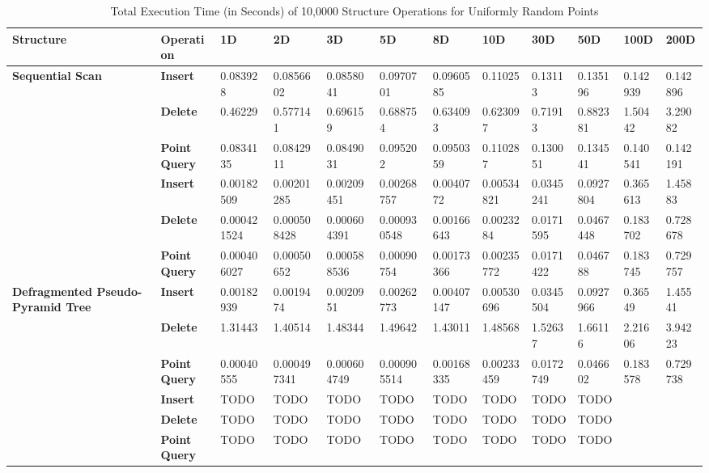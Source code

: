 \begin{landscape}

	\begin{table}
		\centering
		\begin{tabular}{|p{2cm}|l|l|l|l|l|l|l|l|l|l|l|}
			\hline
			\textbf{Structure} & \textbf{Operation} & \textbf{1D} & \textbf{2D} & \textbf{3D} & \textbf{5D} & \textbf{8D} & \textbf{10D} & \textbf{30D} & \textbf{50D} & \textbf{100D} & \textbf{200D} \\
			\hline
			\multirow{ 4}{*}{\textbf{Sequential Scan}} & \textbf{Insert} & 0.083928 & 0.0856602 & 0.0858041 & 0.0970701 & 0.0960585 & 0.11025 & 0.13113 & 0.135196 & 0.142939 & 0.142896 \\ & \textbf{Delete} & 0.46229 & 0.577141 & 0.696159 & 0.688754 & 0.634093 & 0.623097 & 0.71913 & 0.882381 & 1.50442 & 3.29082 \\ & \textbf{Point Query} & 0.0834135 & 0.0842911 & 0.0849031 & 0.095202 & 0.0950359 & 0.110287 & 0.130051 & 0.134541 & 0.140541 & 0.142191 \\
			\hline
			\multirow{ 4}{*}{\textbf{Batch Pseudo-Pyramid Tree}} & \textbf{Insert} & 0.00182509 & 0.00201285 & 0.00209451 & 0.00268757 & 0.0040772 & 0.00534821 & 0.0345241 & 0.0927804 & 0.365613 & 1.45883 \\ & \textbf{Delete} & 0.000421524 & 0.000508428 & 0.000604391 & 0.000930548 & 0.00166643 & 0.0023284 & 0.0171595 & 0.0467448 & 0.183702 & 0.728678 \\ & \textbf{Point Query} & 0.000406027 & 0.00050652 & 0.000588536 & 0.00090754 & 0.00173366 & 0.00235772 & 0.0171422 & 0.046788 & 0.183745 & 0.729757 \\
			\hline
			\multirow{ 4}{*}{\textbf{Defragmented Pseudo-Pyramid Tree}} & \textbf{Insert} & 0.00182939 & 0.0019474 & 0.0020951 & 0.00262773 & 0.00407147 & 0.00530696 & 0.0345504 & 0.0927966 & 0.36549 & 1.45541 \\ & \textbf{Delete} & 1.31443 & 1.40514 & 1.48344 & 1.49642 & 1.43011 & 1.48568 & 1.52637 & 1.66116 & 2.21606 & 3.94223 \\ & \textbf{Point Query} & 0.00040555 & 0.000497341 & 0.000604749 & 0.000905514 & 0.00168335 & 0.00233459 & 0.0172749 & 0.046602 & 0.183578 & 0.729738 \\
			\hline
			\multirow{ 4}{*}{\textbf{Rebuild Pseudo-Pyramid Tree}}
			& \textbf{Insert} & TODO & TODO & TODO & TODO & TODO & TODO & TODO & TODO \\
			& \textbf{Delete} & TODO & TODO & TODO & TODO & TODO & TODO & TODO & TODO \\
			& \textbf{Point Query} & TODO & TODO & TODO & TODO & TODO & TODO & TODO & TODO \\
			\hline
		\end{tabular}
		\caption{Total Execution Time (in Seconds) of 10,0000 Structure Operations for Uniformly Random Points}
		\label{tab:perf1-randuniform}
	\end{table}


\end{landscape}
